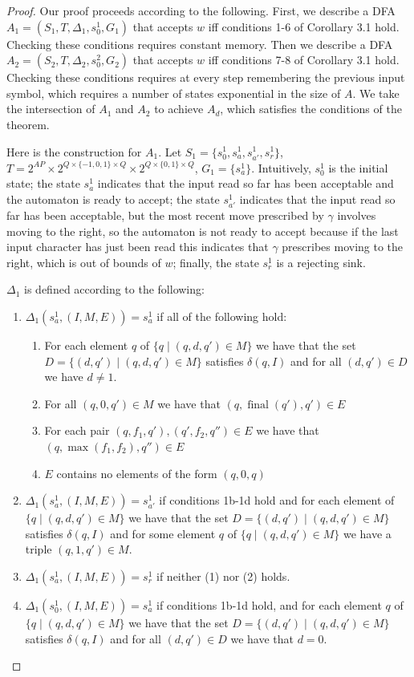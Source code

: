 \documentclass{lmcs}
\theoremstyle{definition}
\DeclareMathOperator{\?}{?}
\DeclareMathOperator{\final}{final}
\begin{document}
\begin{proof}
  Our proof proceeds according to the following. First, we describe a DFA $A_1 = (S_1, T, \Delta_1, s^1_0, G_1)$ that accepts $w$ iff conditions 1-6 of Corollary 3.1 hold. Checking these conditions requires constant memory. Then we describe a DFA $A_2 = (S_2, T, \Delta_2, s^2_0, G_2)$ that accepts $w$ iff conditions 7-8 of Corollary 3.1 hold. Checking these conditions requires at every step remembering the previous input symbol, which requires a number of states exponential in the size of $A$. We take the intersection of $A_1$ and $A_2$ to achieve $A_d$, which satisfies the conditions of the theorem.

Here is the construction for $A_1$. Let $S_1 = \{s^1_0,s^1_a,s^1_{a'},s^1_r\}$, $T = 2^{AP} \times 2^{Q \times \{-1,0,1\} \times Q} \times 2^{Q \times \{0,1\} \times Q}$, $G_1 = \{s^1_a\}$. Intuitively, $s^1_0$ is the initial state; the state $s^1_a$ indicates that the input read so far has been acceptable and the automaton is ready to accept; the state $s^1_{a'}$ indicates that the input read so far has been acceptable, but the most recent move prescribed by $\gamma$ involves moving to the right, so the automaton is not ready to accept because if the last input character has just been read this indicates that $\gamma$ prescribes moving to the right, which is out of bounds of $w$; finally, the state $s^1_r$ is a rejecting sink.

$\Delta_1$ is defined according to the following:
\begin{enumerate}
\item $\Delta_1(s^1_a,(I,M,E)) = s^1_a$ if all of the following hold:
\begin{enumerate}
    \item For each element $q$ of $\{q \mid (q,d,q') \in M\}$ we have that the set $D=\{(d,q') \mid (q,d,q') \in M\}$ satisfies $\delta(q,I)$ and
    for all $(d,q')\in D$ we have $d \neq 1$.
    \item For all $(q,0,q') \in M$ we have that $(q,\final(q'),q') \in E$
    \item For each pair $(q,f_1,q'),(q',f_2,q'') \in E$ we have that $(q,\max(f_1,f_2),q'') \in E$
    \item $E$ contains no elements of the form $(q,0,q)$
\end{enumerate}
\item $\Delta_1(s^1_a,(I,M,E)) = s^1_{a'}$ if conditions 1b-1d hold and for each element of $\{q \mid (q,d,q') \in M\}$ we have that the set $D = \{(d,q') \mid (q,d,q') \in M\}$ satisfies $\delta(q,I)$ and for some element $q$ of $\{q \mid (q,d,q') \in M\}$ we have a triple $(q,1,q')\in M$.
\item $\Delta_1(s^1_a,(I,M,E)) = s^1_r$ if neither (1) nor (2) holds.
\item $\Delta_1(s^1_0,(I,M,E)) = s^1_a$ if conditions 1b-1d hold, and for each element $q$ of $\{q \mid (q,d,q') \in M\}$ we have that the set $D = \{(d,q') \mid (q,d,q') \in M\}$ satisfies $\delta(q,I)$ and for all $(d,q') \in D$ we have that $d = 0$.


\end{enumerate}
\end{proof}
\end{document}
